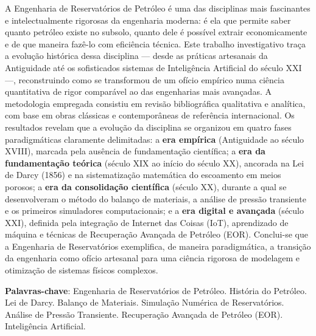 \documentclass[12pt,a4paper,oneside,brazilian,sumario=tradicional]{abntex2}
\begin{document}
\setlength{\absparsep}{18pt}
\begin{resumo}
A Engenharia de Reservatórios de Petróleo é uma das disciplinas mais fascinantes e intelectualmente rigorosas da engenharia moderna: é ela que permite saber quanto petróleo existe no subsolo, quanto dele é possível extrair economicamente e de que maneira fazê-lo com eficiência técnica. Este trabalho investigativo traça a evolução histórica dessa disciplina — desde as práticas artesanais da Antiguidade até os sofisticados sistemas de Inteligência Artificial do século XXI —, reconstruindo como se transformou de um ofício empírico numa ciência quantitativa de rigor comparável ao das engenharias mais avançadas. A metodologia empregada consistiu em revisão bibliográfica qualitativa e analítica, com base em obras clássicas e contemporâneas de referência internacional. Os resultados revelam que a evolução da disciplina se organizou em quatro fases paradigmáticas claramente delimitadas: a \textbf{era empírica} (Antiguidade ao século XVIII), marcada pela ausência de fundamentação científica; a \textbf{era da fundamentação teórica} (século XIX ao início do século XX), ancorada na Lei de Darcy (1856) e na sistematização matemática do escoamento em meios porosos; a \textbf{era da consolidação científica} (século XX), durante a qual se desenvolveram o método do balanço de materiais, a análise de pressão transiente e os primeiros simuladores computacionais; e a \textbf{era digital e avançada} (século XXI), definida pela integração de Internet das Coisas (IoT), aprendizado de máquina e técnicas de Recuperação Avançada de Petróleo (EOR). Conclui-se que a Engenharia de Reservatórios exemplifica, de maneira paradigmática, a transição da engenharia como ofício artesanal para uma ciência rigorosa de modelagem e otimização de sistemas físicos complexos.

\vspace{\onelineskip}
\noindent
\textbf{Palavras-chave}: Engenharia de Reservatórios de Petróleo. História do Petróleo. Lei de Darcy. Balanço de Materiais. Simulação Numérica de Reservatórios. Análise de Pressão Transiente. Recuperação Avançada de Petróleo (EOR). Inteligência Artificial.
\end{resumo}
\end{document}
